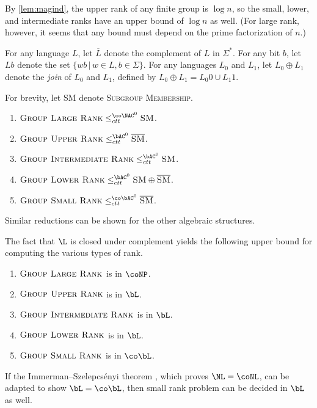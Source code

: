 \documentclass{article}
\begin{document}
By \autoref{lem:magind}, the upper rank of any finite group is $\log n$, so the small, lower, and intermediate ranks have an upper bound of $\log n$ as well.
(For large rank, however, it seems that any bound must depend on the prime factorization of $n$.)

For any language $L$, let $\overline{L}$ denote the complement of $L$ in $\Sigma^*$.
For any bit $b$, let $Lb$ denote the set $\{ wb \, | \, w \in L, b \in \Sigma\}$.
For any languages $L_0$ and $L_1$, let $L_0 \oplus L_1$ denote the \emph{join} of $L_0$ and $L_1$, defined by $L_0 \oplus L_1 = L_0 0 \cup L_1 1$.

\begin{lemma}
  For brevity, let \textsc{SM} denote \textsc{Subgroup Membership}.
  \mbox{}
  \begin{enumerate}
  \item $\textsc{Group Large Rank} \leq_{ctt}^{\co\NAC^0} \textsc{SM}$.
  \item $\textsc{Group Upper Rank} \leq_{ctt}^{\bAC^0} \overline{\textsc{SM}}$.
  \item $\textsc{Group Intermediate Rank} \leq_{ctt}^{\bAC^0} \textsc{SM}$.
  \item $\textsc{Group Lower Rank} \leq_{ctt}^{\bAC^0} \textsc{SM} \oplus \overline{\textsc{SM}}$.
  \item $\textsc{Group Small Rank} \leq_{ctt}^{\co\bAC^0} \overline{\textsc{SM}}$.
  \end{enumerate}
\end{lemma}

Similar reductions can be shown for the other algebraic structures.

The fact that $\L$ is closed under complement yields the following upper bound for computing the various types of rank.

\begin{theorem}
  \mbox{}
  \begin{enumerate}
  \item $\textsc{Group Large Rank}$ is in $\coNP$.
  \item $\textsc{Group Upper Rank}$ is in $\bL$.
  \item $\textsc{Group Intermediate Rank}$ is in $\bL$.
  \item $\textsc{Group Lower Rank}$ is in $\bL$.
  \item $\textsc{Group Small Rank}$ is in $\co\bL$.
  \end{enumerate}
\end{theorem}

If the Immerman–Szelepcsényi theorem \autocite{immerman88, szelepcsenyi88}, which proves $\NL = \coNL$, can be adapted to show $\bL = \co\bL$, then small rank problem can be decided in $\bL$ as well.

\printbibliography
\end{document}
